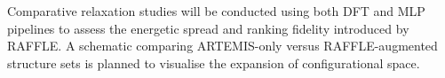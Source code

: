 
Comparative relaxation studies will be conducted using both DFT and MLP pipelines to assess the energetic spread and
ranking fidelity introduced by RAFFLE. A schematic comparing ARTEMIS-only versus RAFFLE-augmented structure sets is
planned to visualise the expansion of configurational space.



